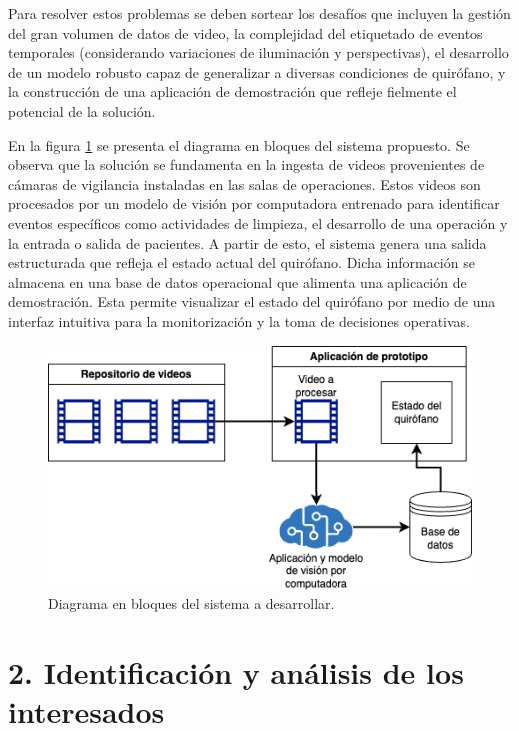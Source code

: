 \documentclass[
11pt, %
]{charter}
\begin{document}
Para resolver estos problemas se deben sortear los desafíos que incluyen la gestión del gran volumen de datos de video, la complejidad del etiquetado de eventos temporales (considerando variaciones de iluminación y perspectivas), el desarrollo de un modelo robusto capaz de generalizar a diversas condiciones de quirófano, y la construcción de una aplicación de demostración que refleje fielmente el potencial de la solución.

En la figura \ref{fig:Esquema} se presenta el diagrama en bloques del sistema propuesto. Se observa que la solución se fundamenta en la ingesta de videos provenientes de cámaras de vigilancia instaladas en las salas de operaciones. Estos videos son procesados por un modelo de visión por computadora entrenado para identificar eventos específicos como actividades de limpieza, el desarrollo de una operación y la entrada o salida de pacientes. A partir de esto, el sistema genera una salida estructurada que refleja el estado actual del quirófano. Dicha información se almacena en una base de datos operacional que alimenta una aplicación de demostración. Esta permite visualizar el estado del quirófano por medio de una interfaz intuitiva para la monitorización y la toma de decisiones operativas.

\begin{figure}[htpb]
	\centering 
	\includegraphics[width=.6\textwidth]{./Figuras/CEIA-GDP-Esquema.png}
	\caption{Diagrama en bloques del sistema a desarrollar.}
	\label{fig:Esquema}
\end{figure}

\section{2. Identificación y análisis de los interesados}
\label{sec:interesados}
\end{document}
